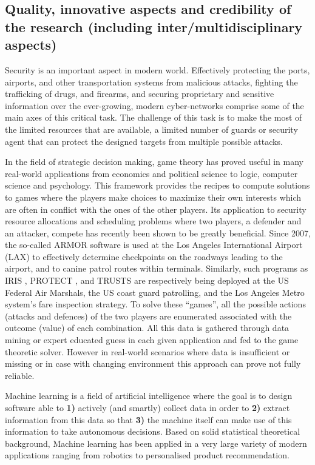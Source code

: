 
\subsection{Quality, innovative aspects and credibility of the research (including inter/multidisciplinary aspects)}
\label{sec:quality}


Security is an important aspect in modern world.
Effectively protecting the ports, airports, and other transportation systems from malicious attacks,
fighting the trafficking of drugs, and firearms, and securing proprietary and sensitive information over the ever-growing, modern cyber-networks comprise some of the main axes of this critical task. The challenge of this task is to make the most of the limited resources that are  available, a limited number of guards or security agent that can protect the designed targets from multiple possible attacks.

In the field of strategic decision making, game theory has proved useful in many real-world applications from economics and political science to logic, computer science and psychology. This framework provides the recipes to compute solutions to games where the players make choices to maximize their own interests which are often in conflict with the ones of the other players. 
Its application to security resource allocations and scheduling problems where two players, a defender and an attacker, compete  has recently been shown to be greatly beneficial.
Since 2007, the so-called ARMOR software \cite{pita2008deployed} is used at the Los Angeles International Airport (LAX) to effectively determine 
checkpoints on the roadways leading to the airport, and to canine patrol routes within terminals. 
Similarly, such programs as IRIS \cite{tsai2009iris}, PROTECT \cite{shieh2012protect}, and TRUSTS \cite{yin2012trusts} are respectively being deployed at the US Federal Air Marshals, the US coast guard patrolling, and the Los Angeles Metro system's fare inspection strategy. To solve these ``games'', all the possible actions (attacks and defences) of the two players are enumerated associated with the outcome (value) of each combination. All this data is gathered through data mining or expert educated guess in each given application and fed to the game theoretic solver. However in real-world scenarios where data is insufficient or missing or in case with changing environment this approach can prove not fully reliable.

Machine learning is a field of artificial intelligence where the goal is to design software able to \textbf{ 1)} actively (and smartly) collect data in order to \textbf{2)}  extract information from this data so that \textbf{3)} the machine itself can make use of this information to take autonomous decisions.  Based on solid statistical theoretical background, Machine learning has been applied in a very large variety of modern applications ranging from robotics to personalised product recommendation. 

